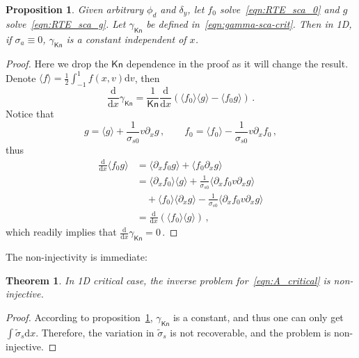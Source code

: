 \documentclass[english,reqno]{amsart}
\theoremstyle{plain}
\newtheorem{theorem}{Theorem}
\newtheorem{proposition}{Proposition}
\theoremstyle{definition} %
\newcommand{\rd}{\mathrm{d}}
\newcommand{\Kn}{\mathsf{Kn}}
\begin{document}
\begin{proposition}\label{thm:RTE_sca}
Given arbitrary $\phi_d$ and $\delta_y$, let $f_0$ solve~\eqref{eqn:RTE_sca_0} and $g$ solve~\eqref{eqn:RTE_sca_g}. Let $\gamma_\Kn$ be defined in~\eqref{eqn:gamma-sca-crit}. Then in 1D, if $\sigma_a \equiv 0$, $\gamma_\Kn$ is a constant independent of $x$.
\end{proposition}
\begin{proof}
Here we drop the $\Kn$ dependence in the proof as it will change the result. Denote $\langle f\rangle=\frac{1}{2}\int_{-1}^1 f(x,v)\rd{v}$, then
\begin{equation*}
\frac{\rd}{\rd x}\gamma_\Kn=\frac{1}{\Kn}\frac{\rd}{\rd x}(\langle f_0\rangle \langle g\rangle-\langle f_0g\rangle ) \,.
\end{equation*}
Notice that 
\begin{equation*}
g=\langle g\rangle +\frac{1}{\sigma_{s0}}v \partial_x g\,,\qquad
f_0 =\langle f_0\rangle-\frac{1}{\sigma_{s0}}v \partial_x f_0\,,
\end{equation*}
thus
\begin{align*}
\frac{\rd}{\rd x}\langle f_0 g\rangle&=\langle \partial_x f_0 g\rangle+\langle f_0\partial_x g\rangle\\
&=\langle \partial_xf_0  \rangle\langle g\rangle +\frac{1}{\sigma_{s0}}\langle \partial_xf_0 v\partial_x g\rangle \\
&\quad +\langle f_0\rangle \langle \partial_xg\rangle -\frac{1}{\sigma_{s0}}\langle \partial_xf_0 v\partial_x g\rangle \\
&=\frac{\rd}{\rd x}(\langle f_0\rangle\langle g\rangle)\,,
\end{align*}
which readily implies that $\frac{\rd}{\rd x}\gamma_\Kn=0$\,.

\end{proof}
The non-injectivity is immediate:
\begin{theorem}
In 1D critical case, the inverse problem for~\eqref{eqn:A_critical} is non-injective.
\end{theorem}
\begin{proof}
According to proposition~\ref{thm:RTE_sca}, $\gamma_\Kn$ is a constant, and thus one can only get $\int\tilde{\sigma}_s\rd{x}$. Therefore, the variation in $\tilde{\sigma}_s$ is not recoverable, and the problem is non-injective.
\end{proof}
 
\end{document}
